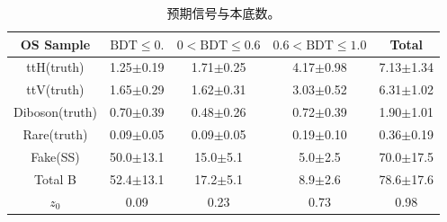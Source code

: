 \begin{table}[htbp]
\begin{center}
\begin{tabular}{c|c|c|c|c}\hline
OS Sample & $\text{BDT}\le0.$  & $0<\text{BDT}\le 0.6$ & $0.6<\text{BDT}\le 1.0$ & Total \\ \hline
ttH(truth) & 1.25$\pm$0.19 & 1.71$\pm$0.25 & 4.17$\pm$0.98 & 7.13$\pm$1.34 \\
ttV(truth) & 1.65$\pm$0.29 & 1.62$\pm$0.31 & 3.03$\pm$0.52  & 6.31$\pm$1.02\\
Diboson(truth) & 0.70$\pm$0.39 & 0.48$\pm$0.26 & 0.72$\pm$0.39 & 1.90$\pm$1.01\\
Rare(truth) & 0.09$\pm$0.05 & 0.09$\pm$0.05 & 0.19$\pm$0.10 & 0.36$\pm$0.19\\
Fake(SS) & 50.0$\pm$13.1 & 15.0$\pm$5.1 & 5.0$\pm$2.5 & 70.0$\pm$17.5\\
Total B & 52.4$\pm$13.1 & 17.2$\pm$5.1 & 8.9$\pm$2.6 & 78.6$\pm$17.6\\ \hline
$z_0$ & 0.09 & 0.23 & 0.73 & 0.98\\ \hline
\end{tabular}
\caption{预期信号与本底数。}
\label{Tab:1l2tau.summary}
\end{center}
\end{table}
\clearpage
